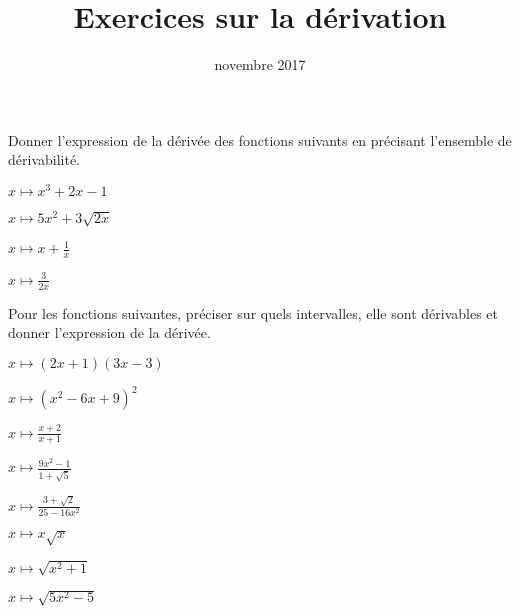 \documentclass[12pt,a4paper,french]{article}
\title{Exercices sur la dérivation}
\author{\bsc{Ts 2}}
\date{novembre 2017}
\makeatletter
\renewcommand{\maketitle}%
{\framebox{%
    \begin{minipage}{1.0\linewidth}%
      \begin{center}%
        \Large \@title ~-- \@author \\%
        \@date%
      \end{center}%
    \end{minipage}}%
  \normalsize%
}
\theoremstyle{break}
\theoremstyle{plain}
\theoremstyle{nonumberplain}
\theoremstyle{nonumberbreak}
\makeatother
\begin{document}
\maketitle

\bigskip

\begin{question}[subtitle={Un peu de calcul}, class=1,
  topic={dérivabilité}]
  Donner l'expression de la dérivée des fonctions suivants en précisant
  l'ensemble de dérivabilité.

  \begin{enumerate*}[itemjoin=\hfill]
    \item $x\mapsto x^3 + 2x - 1$
    \item $x\mapsto 5x^2 + 3\sqrt{2x}$
    \item $x\mapsto x + \frac1x$
    \item $x\mapsto \frac{3}{2x}$
  \end{enumerate*}
\end{question}

\begin{question}[subtitle={Calculs de dérivées},
  class=3,topic={dérivabilité}]
  Pour les fonctions suivantes, préciser sur quels intervalles, elle
  sont dérivables et donner l'expression de la dérivée.

  \begin{enumerate*}[itemjoin=\hspace{5mm}\hfill]
    \item $x\mapsto (2x + 1)(3x -3)$
    \item $x\mapsto (x^2 - 6x + 9)^2$
    \item $x\mapsto \frac{x + 2}{x+1}$
    \item $x\mapsto \frac{9x^2 - 1}{1 + \sqrt{5}}$
    \item $x\mapsto \frac{3 + \sqrt{2}}{25 - 16x^2}$
    \item $x\mapsto x\sqrt{x}$
    \item $x\mapsto \sqrt{x^2 + 1}$
    \item $x\mapsto \sqrt{5x^2 - 5}$
  \end{enumerate*}
\end{question}
\end{document}
